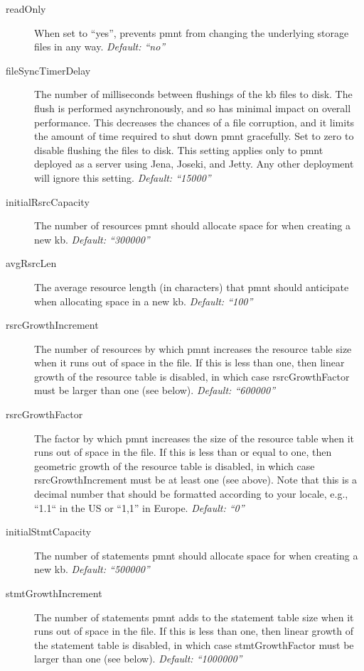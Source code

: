 \begin{description}
	\item[readOnly] When set to ``yes'', prevents \ac{pmnt} from changing the underlying storage files in any way. \emph{Default: ``no''}

	\item[fileSyncTimerDelay] The number of milliseconds between flushings of the \ac{kb} files to disk.  The flush is performed asynchronously, and so has minimal impact on overall performance.  This decreases the chances of a file corruption, and it limits the amount of time required to shut down \ac{pmnt} gracefully. Set to zero to disable flushing the files to disk.  This setting applies only to \ac{pmnt} deployed as a server using Jena, Joseki, and Jetty.  Any other deployment will ignore this setting. \emph{Default: ``15000''}

	\item[initialRsrcCapacity] The number of resources \ac{pmnt} should allocate space for when creating a new \ac{kb}. \emph{Default: ``300000''}

	\item[avgRsrcLen] The average resource length (in characters) that \ac{pmnt} should anticipate when allocating space in a new \ac{kb}. \emph{Default: ``100''}

	\item[rsrcGrowthIncrement] The number of resources by which \ac{pmnt} increases the resource table size when it runs out of space in the file.  If this is less than one, then linear growth of the resource table is disabled, in which case rsrcGrowthFactor must be larger than one (see below). \emph{Default: ``600000''}

	\item[rsrcGrowthFactor] The factor by which \ac{pmnt} increases the size of the resource table when it runs out of space in the file.  If this is less than or equal to one, then geometric growth of the resource table is disabled, in which case rsrcGrowthIncrement must be at least one (see above).  Note that this is a decimal number that should be formatted according to your locale, e.g., ``1.1`` in the US or ``1,1'' in Europe. \emph{Default: ``0''}

	\item[initialStmtCapacity] The number of statements \ac{pmnt} should allocate space for when creating a new \ac{kb}. \emph{Default: ``500000''}

	\item[stmtGrowthIncrement] The number of statements \ac{pmnt} adds to the statement table size when it runs out of space in the file.  If this is less than one, then linear growth of the statement table is disabled, in which case stmtGrowthFactor must be larger than one (see below). \emph{Default: ``1000000''}


\end{description}
